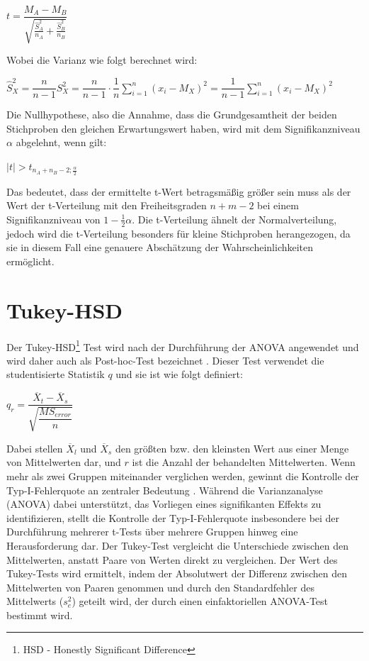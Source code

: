 \begin{center}
  $t = \dfrac{M_A-M_B}{\sqrt{\frac{\hat{S}_A^2}{n_A} + \frac{\hat{S}_B^2}{n_B}}}$
\end{center}

Wobei die Varianz wie folgt berechnet wird:

\begin{center}
  $\hat{S}_X^2 = \dfrac{n}{n-1} S_X^2 = \dfrac{n}{n-1} \cdot \dfrac{1}{n} \sum_{i=1}^n (x_i - M_X)^2 = \dfrac{1}{n-1} \sum_{i=1}^n (x_i - M_X)^2$
\end{center}

Die Nullhypothese, also die Annahme, dass die Grundgesamtheit der beiden Stichproben 
den gleichen Erwartungswert haben, wird mit dem Signifikanzniveau $\alpha$ abgelehnt, wenn gilt:

\begin{center}
  $|t| > t_{n_A + n_B - 2; \frac{\alpha}{2}}$
\end{center}

Das bedeutet, dass der ermittelte t-Wert betragsmäßig größer sein muss als der Wert der t-Verteilung mit den Freiheitsgraden
 $n+m-2$ bei einem Signifikanzniveau von $1-\frac{1}{2}\alpha$.
Die t-Verteilung ähnelt der Normalverteilung, jedoch wird die t-Verteilung besonders für kleine Stichproben herangezogen, 
da sie in diesem Fall eine genauere Abschätzung der Wahrscheinlichkeiten ermöglicht.



\section{Tukey-HSD}
Der Tukey-HSD\footnote{HSD - Honestly Significant Difference} Test wird nach der Durchführung der ANOVA angewendet und wird daher auch als Post-hoc-Test bezeichnet \cite[S. 391 ff.]{tukey_hsd_book}.
Dieser Test verwendet die studentisierte Statistik $q$ und sie ist wie folgt definiert:

\begin{center}
  $q_r = \dfrac{\overline{X}_t - \overline{X}_s}{\sqrt{\dfrac{MS_{error}}{n}}}$
\end{center}

Dabei stellen $\overline{X}_l$ und $\overline{X}_s$ den größten bzw. den kleinsten Wert aus einer Menge von Mittelwerten dar, 
und $r$ ist die Anzahl der behandelten Mittelwerten.
Wenn mehr als zwei Gruppen miteinander verglichen werden, gewinnt die Kontrolle der Typ-I-Fehlerquote an zentraler Bedeutung \cite{tukey_HSD}. 
Während die Varianzanalyse (ANOVA) dabei unterstützt, das Vorliegen eines signifikanten Effekts zu identifizieren, 
stellt die Kontrolle der Typ-I-Fehlerquote insbesondere bei der Durchführung mehrerer t-Tests über mehrere Gruppen hinweg eine Herausforderung dar.
Der Tukey-Test vergleicht die Unterschiede zwischen den Mittelwerten, 
anstatt Paare von Werten direkt zu vergleichen. Der Wert des Tukey-Tests wird ermittelt, 
indem der Absolutwert der Differenz zwischen den Mittelwerten von Paaren genommen und durch den Standardfehler des Mittelwerts ($s^2_e$) geteilt wird, 
der durch einen einfaktoriellen ANOVA-Test bestimmt wird.


